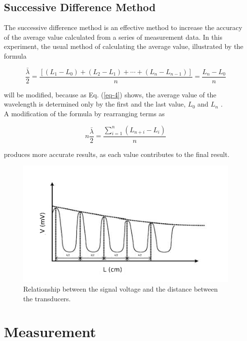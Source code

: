 \documentclass{article}
\begin{document}
\subsection{Successive Difference Method}
The successive difference method is an effective method to increase the accuracy of
the average value calculated from a series of measurement data. In this experiment, the
usual method of calculating the average value, illustrated by the formula

\begin{equation}\label{eq-4}
\frac{\bar{\lambda}}{2}=\frac{[(L_1-L_0)+(L_2-L_1)+\cdots+(L_n-L_{n-1})]}{n}=\frac{L_n-L_0}{n}
\end{equation}

will be modified, because as Eq. (\ref{eq-4}) shows, the average value of the wavelength is determined only by the first and the last value, $L_0$ and $L_n$ .
\\

A modification of the formula by rearranging terms as

\begin{equation}\label{eq-5}
n\frac{\bar{\lambda}}{2}=\frac{\sum_{i=1}^n(L_{n+i}-L_i)}{n}
\end{equation}

produces more accurate results, as each value contributes to the final result.

\begin{figure}[!h]
	\centering
	\includegraphics[width=13cm]{fig-2.png}
	\caption{Relationship between the signal voltage and the distance between the transducers.
	\label{fig-2}}
\end{figure}

\section{Measurement}
\end{document}
